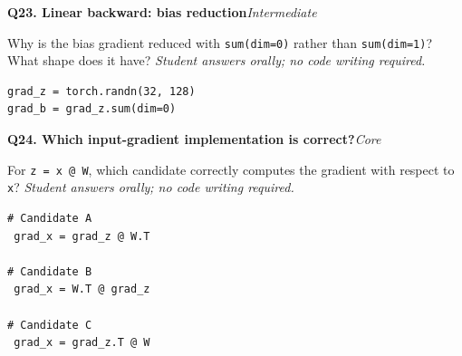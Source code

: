 \documentclass[11pt]{article}
\newif\ifshowanswers
\newenvironment{question}[3]{%
  \par\medskip
  \noindent\textbf{Q#1. #2}\hfill\textit{#3}\par\smallskip
}{\par\medskip}
\newcommand{\answer}[1]{%
  \ifshowanswers
    \begin{quote}\small\textbf{Expected answer:} #1\end{quote}
  \fi
}
\newcommand{\marking}[1]{%
  \ifshowanswers
    \begin{quote}\small\textbf{1 mark:} #1\end{quote}
  \fi
}
\newcommand{\oralnote}{\textit{Student answers orally; no code writing required.}}
\begin{document}
\begin{question}{23}{Linear backward: bias reduction}{Intermediate}
Why is the bias gradient reduced with \texttt{sum(dim=0)} rather than \texttt{sum(dim=1)}? What shape does it have? \oralnote

\begin{lstlisting}
grad_z = torch.randn(32, 128)
grad_b = grad_z.sum(dim=0)
\end{lstlisting}

\answer{Each of the 128 bias entries is shared across all 32 samples, so gradient contributions must be summed over the batch dimension. The resulting shape is $(128,)$.}
\marking{Student identifies the batch dimension and gives shape $(128,)$.}
\end{question}

\begin{question}{24}{Which input-gradient implementation is correct?}{Core}
For \texttt{z = x @ W}, which candidate correctly computes the gradient with respect to \texttt{x}? \oralnote

\begin{lstlisting}
# Candidate A
 grad_x = grad_z @ W.T

# Candidate B
 grad_x = W.T @ grad_z

# Candidate C
 grad_x = grad_z.T @ W
\end{lstlisting}

\answer{Candidate A. If $x$ is $(B,D)$, $W$ is $(D,H)$, and $grad\_z$ is $(B,H)$, then $grad\_z W^T$ has shape $(B,D)$, matching $x$.}
\marking{Student chooses A and can justify it by the operation/shape.}
\end{question}
\end{document}
